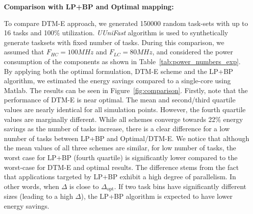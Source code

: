 
\noindent\textbf{Comparison with LP+BP and Optimal mapping:}

To compare DTM-E approach, we generated 150000 random task-sets with up to 16 tasks and 100\% utilization. \emph{UUniFast}\cite{uunifast} algorithm is used to synthetically generate tasksets with fixed number of tasks. During this comparison, we assumed that $F_{HC} = 100MHz$ and $F_{LC} = 80MHz$, and considered the power consumption of the components as shown in Table~\ref{tab:power_numbers_exp}. By applying both the optimal formulation, DTM-E scheme and the LP+BP algorithm, we estimated the energy savings compared to a single-core using Matlab. The results can be seen in Figure~\ref{fig:comparison}. Firstly, note that the performance of DTM-E is near optimal. The mean and second/third quartile values are nearly identical for all simulation points. However, the fourth quartile values are marginally different. %
While all schemes converge towards 22\% energy savings as the number of tasks increase, there is a clear difference for a low number of tasks between LP+BP and Optimal/DTM-E. We notice that although the mean values of all three schemes are similar, for low number of tasks, the worst case for LP+BP (fourth quartile) is significantly lower compared to the worst-case for DTM-E and optimal results. The difference stems from the fact that applications targeted by LP+BP exhibit a high degree of parallelism. In other words, when $\Delta$ is close to $\Delta_\mathrm{opt}$. If two task bins have significantly different sizes (leading to a high $\Delta$), the LP+BP algorithm is expected to have lower energy savings.  
 

